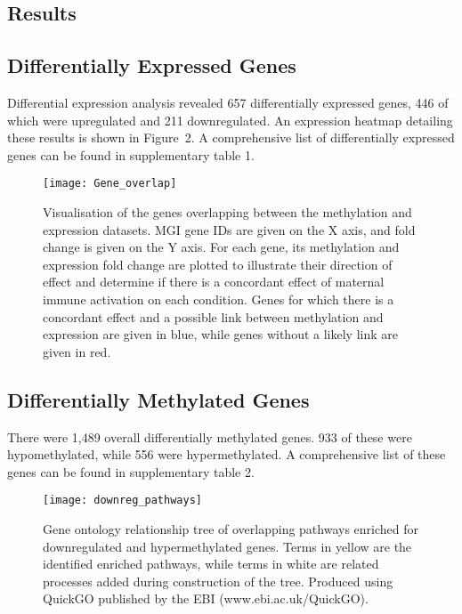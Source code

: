 \documentclass{bioinfo}
\begin{document}
\begin{results}
\section{Results}

\subsection{Differentially Expressed Genes}
Differential expression analysis revealed 657 differentially expressed genes, 446 of which were upregulated and 211 downregulated. An expression heatmap detailing these results is shown in Figure~2\vphantom{\ref{fig:02}}. A comprehensive list of differentially expressed genes can be found in supplementary table 1. 

\begin{figure}[htbp]
\centerline{\texttt{[image: Gene\_overlap]}}
\caption{Visualisation of the genes overlapping between the methylation and expression datasets. MGI gene IDs are given on the X axis, and fold change is given on the Y axis. For each gene, its methylation and expression fold change are plotted to illustrate their direction of effect and determine if there is a concordant effect of maternal immune activation on each condition. Genes for which there is a concordant effect and a possible link between methylation and expression are given in blue, while genes without a likely link are given in red.}\label{fig:03}
\end{figure}

\subsection{Differentially Methylated Genes}
There were 1,489 overall differentially methylated genes. 933 of these were hypomethylated, while 556 were hypermethylated. A comprehensive list of these genes can be found in supplementary table 2.

\begin{figure}[!htb]
\centerline{\texttt{[image: downreg\_pathways]}}
\caption{Gene ontology relationship tree of overlapping pathways enriched for downregulated and hypermethylated genes. Terms in yellow are the identified enriched pathways, while terms in white are related processes added during construction of the tree. Produced using QuickGO published by the EBI \citep{binns_quickgo_2009} (www.ebi.ac.uk/QuickGO).}\label{fig:04}
\end{figure}


\end{results}
\end{document}
